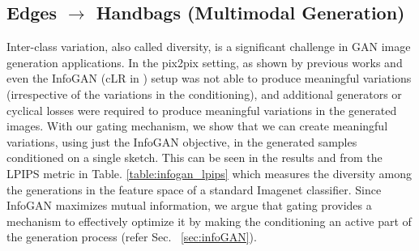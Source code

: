 \subsection{Edges $\rightarrow$ Handbags (Multimodal Generation)}
\label{sec:multimodal}
Inter-class variation, also called diversity, is a significant challenge in GAN image generation applications. 
In the pix2pix setting, as shown by previous works \cite{ghosh2017multi} and \cite{zhu2017toward} even the InfoGAN (cLR in \cite{zhu2017toward}) setup was not able to produce meaningful variations (irrespective of the variations in the conditioning), and additional generators or cyclical losses were required to produce meaningful variations in the generated images. 
With our gating mechanism, we show that we can create meaningful variations, using just the InfoGAN objective, in the generated samples conditioned on a single sketch.
This can be seen in the results  and from the LPIPS metric \cite{zhang2018unreasonable} in  Table. \ref{table:infogan_lpips} which measures the diversity among the generations in the feature space of a standard Imagenet classifier.
Since InfoGAN maximizes mutual information, we argue that gating provides a mechanism to effectively optimize it by making the conditioning an active part of the generation process (refer Sec. ~\ref{sec:infoGAN}).


